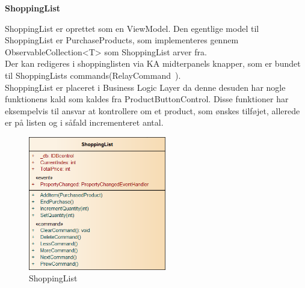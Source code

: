 \textbf{ShoppingList}

ShoppingList er oprettet som en ViewModel. Den egentlige model til ShoppingList er PurchaseProducts, som implementeres gennem ObservableCollection<T> som ShoppingList arver fra.\\
Der kan redigeres i shoppinglisten via \gls{KA} midterpanels knapper, som er bundet til ShoppingLists commands(RelayCommand~\cite{RelayC}).\\
ShoppingList er placeret i Business Logic Layer da denne desuden har nogle funktionens kald som kaldes fra ProductButtonControl. Disse funktioner har eksempelvis til ansvar at kontrollere om et product, som ønskes tilføjet, allerede er på listen og i såfald incrementeret antal. 

\begin{figure}[H]
	\centering
	\includegraphics[width=60mm]{Systemdesign/Frontend/BLL/Pics/ShoppingList}
	\caption{ShoppingList}
	\label{fig:ShoppingList}
\end{figure}

\bigskip